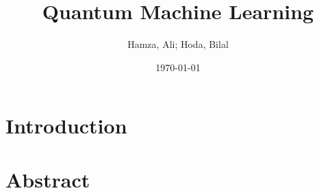 \documentclass{article}
\title{Quantum Machine Learning}
\author{Hamza, Ali; Hoda, Bilal}
\date{\today}
\begin{document}
\maketitle

\section{Introduction}
\section{Abstract}
\end{document}
